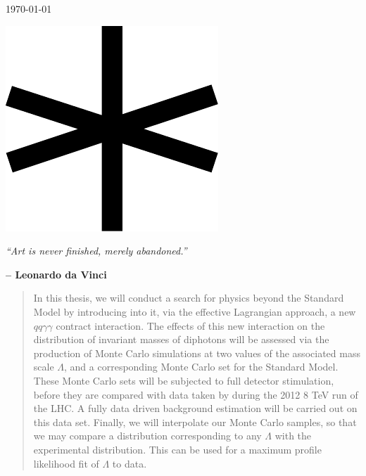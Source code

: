 \begin{titlingpage}
{{\begin{hangparas}{0em}{0}
\today
\end{hangparas}
}
\clearpage}
\thispagestyle{empty}
  \phantom{p}
\vspace{1.16\textwidth}

\begin{center}
\includegraphics[width=.1\textwidth]{star1}

\vspace{2em}
\begin{minipage}{.6\textwidth}
\emph{``Art is never finished, merely abandoned.''}

\raggedleft\small\sffamily\bfseries\vspace{1em} -- Leonardo da Vinci
\end{minipage}
\end{center}
\clearpage
\end{titlingpage}
\frontmatter

\begin{abstract}
In this thesis, we will conduct a search for physics beyond the Standard Model by introducing into it, via the effective Lagrangian approach, a new $qq\gamma\gamma$ contract interaction. The effects of this new interaction on the distribution of invariant masses of diphotons will be assessed via the production of Monte Carlo simulations at two values of the associated mass scale $\Lambda$, and a corresponding Monte Carlo set for the Standard Model. These Monte Carlo sets will be subjected to full \atlas{} detector stimulation, before they are compared with data taken by \atlas{} during the 2012 8 TeV run of the LHC. A fully data driven background estimation will be carried out on this data set. Finally, we will interpolate our Monte Carlo samples, so that we may compare a distribution corresponding to any $\Lambda$ with the experimental distribution. This can be used for a maximum profile likelihood fit of $\Lambda$ to data.
\end{abstract}


